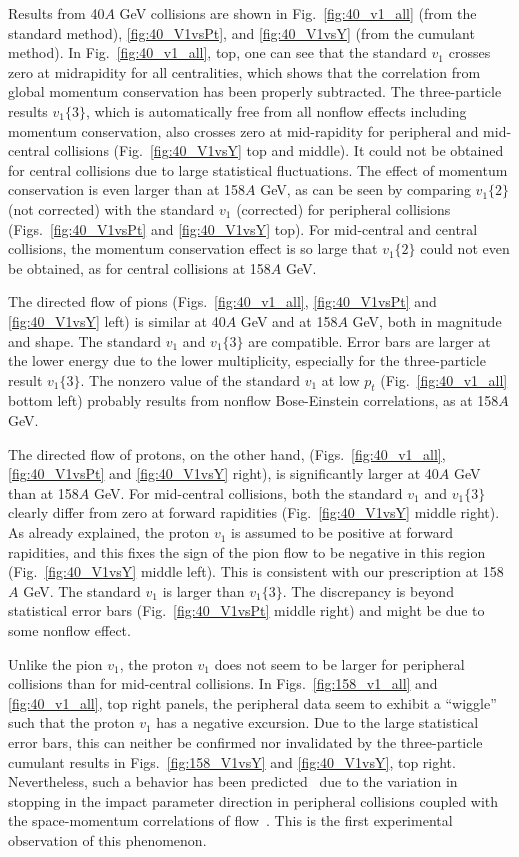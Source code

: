 \documentclass[aps,prc,superscriptaddress,showpacs,floatfix,nofootinbib]{revtex4}
\begin{document}
Results from 40$A$ GeV collisions are shown in
Fig.~\ref{fig:40_v1_all} (from the standard method),
\ref{fig:40_V1vsPt}, and \ref{fig:40_V1vsY} (from the cumulant
method).  In Fig.~\ref{fig:40_v1_all}, top, one can see that the
standard $v_1$ crosses zero at midrapidity for all centralities, which
shows that the correlation from global momentum conservation has been
properly subtracted.  The three-particle results $v_1\{3\}$, which is
automatically free from all nonflow effects including momentum
conservation, also crosses zero at mid-rapidity for peripheral and
mid-central collisions (Fig.~\ref{fig:40_V1vsY} top and middle).  It
could not be obtained for central collisions due to large statistical
fluctuations.  The effect of momentum conservation is even larger than
at 158$A$ GeV, as can be seen by comparing $v_1\{2\}$ (not
corrected) with the standard $v_1$ (corrected) for peripheral
collisions (Figs.~\ref{fig:40_V1vsPt} and \ref{fig:40_V1vsY} top).
For mid-central and central collisions, the momentum conservation
effect is so large that $v_1\{2\}$ could not even be obtained, as for
central collisions at 158$A$ GeV.

The directed flow of pions (Figs.~\ref{fig:40_v1_all}, 
\ref{fig:40_V1vsPt} and \ref{fig:40_V1vsY} left)
is similar at 40$A$ GeV and at 158$A$ GeV, both in magnitude
and shape. The standard $v_1$ and $v_1\{3\}$ are compatible. Error
bars are larger at the lower energy due to the lower multiplicity,
especially for the three-particle result $v_1\{3\}$.  The nonzero
value of the standard $v_1$ at low $p_t$ (Fig.~\ref{fig:40_v1_all}
bottom left) probably results from nonflow Bose-Einstein correlations,
as at 158$A$ GeV.

The directed flow of protons, on the other hand, 
(Figs.~\ref{fig:40_v1_all}, 
\ref{fig:40_V1vsPt} and \ref{fig:40_V1vsY} right),
is significantly larger at 40$A$ GeV than at 158$A$ GeV.
For mid-central collisions, both the standard $v_1$ and $v_1\{3\}$
clearly differ from zero at forward rapidities
(Fig.~\ref{fig:40_V1vsY} middle right).  As already explained, the
proton $v_1$ is assumed to be positive at forward rapidities, and this
fixes the sign of the pion flow to be negative in this region
(Fig.~\ref{fig:40_V1vsY} middle left).  This is consistent with our
prescription at 158$A$ GeV.  The standard $v_1$ is larger than
$v_1\{3\}$. The discrepancy is beyond statistical error bars
(Fig.~\ref{fig:40_V1vsPt} middle right) and might be due to some
nonflow effect.

Unlike the pion $v_1$, the proton $v_1$ does not seem to be 
larger for peripheral collisions than for mid-central collisions.
In Figs.~\ref{fig:158_v1_all} and \ref{fig:40_v1_all}, top right
panels, the peripheral data seem to exhibit a ``wiggle'' such that the
proton $v_1$ has a negative excursion.  Due to the large statistical
error bars, this can neither be confirmed nor invalidated by the
three-particle cumulant results in Figs.~\ref{fig:158_V1vsY} and
\ref{fig:40_V1vsY}, top right. Nevertheless, such a behavior has been
predicted~\cite{Snellings:1999bt} due to the variation in stopping in
the impact parameter direction in peripheral collisions coupled with the
space-momentum correlations of flow~\cite{Voloshin:QM02}. This is the
first experimental observation of this phenomenon. 
\end{document}
